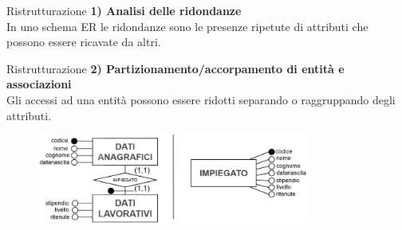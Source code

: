 \begin{frame}{Ristrutturazione}
\textbf{1) Analisi delle ridondanze}
\\\vspace{2em}
In uno schema ER le ridondanze sono le presenze ripetute di attributi che possono essere ricavate da altri.
\end{frame}
%
\begin{frame}{Ristrutturazione}
\textbf{2) Partizionamento/accorpamento di entit\`a e associazioni}
\\\vspace{2em}
Gli accessi ad una entit\`a possono essere ridotti separando o raggruppando degli attributi.
\begin{figure}[h]
        \centering
        \includegraphics[width=0.8\textwidth]{img/i5.png}
    \end{figure}
\end{frame}
